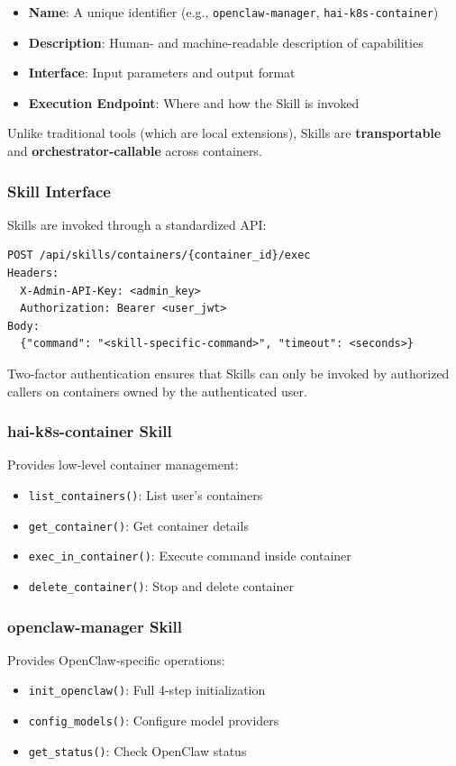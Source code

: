 \begin{itemize}
    \item \textbf{Name}: A unique identifier (e.g., \texttt{openclaw-manager}, \texttt{hai-k8s-container})
    \item \textbf{Description}: Human- and machine-readable description of capabilities
    \item \textbf{Interface}: Input parameters and output format
    \item \textbf{Execution Endpoint}: Where and how the Skill is invoked
\end{itemize}

Unlike traditional tools (which are local extensions), Skills are \textbf{transportable} and \textbf{orchestrator-callable} across containers.

\subsubsection{Skill Interface}
Skills are invoked through a standardized API:

\begin{verbatim}
POST /api/skills/containers/{container_id}/exec
Headers:
  X-Admin-API-Key: <admin_key>
  Authorization: Bearer <user_jwt>
Body:
  {"command": "<skill-specific-command>", "timeout": <seconds>}
\end{verbatim}

Two-factor authentication ensures that Skills can only be invoked by authorized callers on containers owned by the authenticated user.

\subsubsection{hai-k8s-container Skill}
Provides low-level container management:
\begin{itemize}
    \item \texttt{list\_containers()}: List user's containers
    \item \texttt{get\_container()}: Get container details
    \item \texttt{exec\_in\_container()}: Execute command inside container
    \item \texttt{delete\_container()}: Stop and delete container
\end{itemize}

\subsubsection{openclaw-manager Skill}
Provides OpenClaw-specific operations:
\begin{itemize}
    \item \texttt{init\_openclaw()}: Full 4-step initialization
    \item \texttt{config\_models()}: Configure model providers
    \item \texttt{get\_status()}: Check OpenClaw status
\end{itemize}

